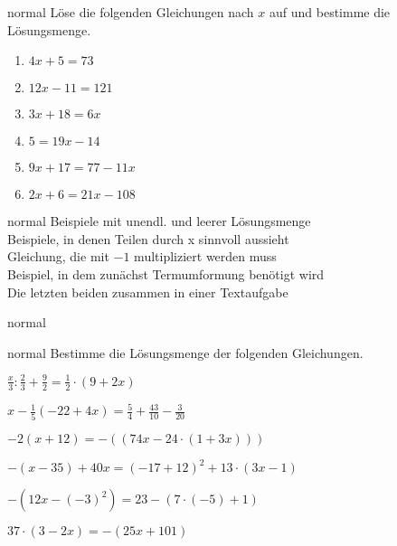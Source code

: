 \documentclass[../lineare_gleichungen.tex]{subfiles}
\begin{document}
    \begin{exercise}{normal}
        Löse die folgenden Gleichungen nach $x$ auf und bestimme die Lösungsmenge.
        \begin{multicols}{3}
            \begin{enumerate}
                \item $4x+5=73$
                \item $12x-11=121$
                \item $3x+18=6x$
                \item $5=19x-14$
                \item $9x+17=77-11x$
                \item $2x+6=21x-108$
            \end{enumerate}
        \end{multicols}
    \end{exercise}
    \begin{exercise}{normal}
        Beispiele mit unendl. und leerer Lösungsmenge\\
        Beispiele, in denen Teilen durch x sinnvoll aussieht\\
        Gleichung, die mit $-1$ multipliziert werden muss\\
        Beispiel, in dem zunächst Termumformung benötigt wird\\
        Die letzten beiden zusammen in einer Textaufgabe
    \end{exercise}
    \begin{exercise}{normal}
    \end{exercise}
    \begin{exercise}{normal}
        Bestimme die Lösungsmenge der folgenden Gleichungen.
        \begin{enumerate}
            \begin{multicols}{2}
                \item $\frac{x}{3}:\frac{2}{3}+\frac{9}{2}=\frac{1}{2}\cdot (9+2x)$
                \item $x-\frac{1}{5}(-22+4x)=\frac{5}{4}+\frac{43}{10}-\frac{3}{20}$
                \item $-2(x+12)=-((74x-24\cdot(1+3x)))$
                \item $-(x-35)+40x=(-17+12)^2+13\cdot(3x-1)$
                \item $-(12x-(-3)^2)=23-(7\cdot(-5)+1)$
                \item $37\cdot(3-2x)=-(25x+101)$
            \end{multicols}
        \end{enumerate}
    \end{exercise}
\end{document}
